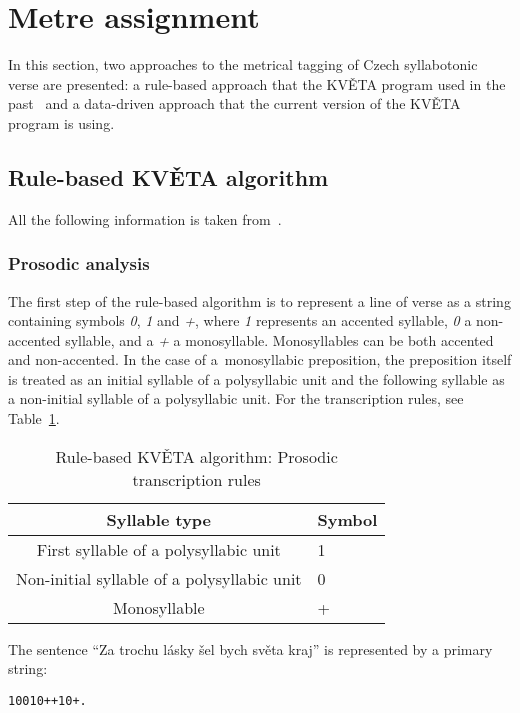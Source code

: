\section{Metre assignment}
In this section, two approaches to the metrical tagging of Czech syllabotonic verse are presented: a rule-based approach that the KVĚTA program used in the past~\cite{TowardsAutomaticAnalysis} and a data-driven approach that the current version of the KVĚTA program is using.~\cite{KVETA}

\subsection{Rule-based KVĚTA algorithm}
All the following information is taken from~\cite{TowardsAutomaticAnalysis}.

\subsubsection{Prosodic analysis}
The first step of the rule-based algorithm is to represent a line of verse as a string containing symbols \emph{0}, \emph{1} and \emph{+}, where \emph{1} represents an accented syllable, \emph{0} a non-accented syllable, and a \emph{+} a monosyllable. Monosyllables can be both accented and non-accented. In the case of a~monosyllabic preposition, the preposition itself is treated as an initial syllable of a polysyllabic unit and the following syllable as a non-initial syllable of a polysyllabic unit. For the transcription rules, see Table~\ref{tab:kveta-rule-based-transcription-rules}.

\begin{table}[htpb]
\centering
\caption{Rule-based KVĚTA algorithm: Prosodic transcription rules}\label{tab:kveta-rule-based-transcription-rules}
\begin{tabular}{|c||l|}\hline
    Syllable type & Symbol\\\hline\hline
    First syllable of a polysyllabic unit & 1\\
    Non-initial syllable of a polysyllabic unit & 0\\
    Monosyllable & +\\\hline
\end{tabular}
\end{table}

The sentence \enquote{Za trochu lásky šel bych světa kraj} is represented by a primary string:
\begin{verbatim}
10010++10+.
\end{verbatim}

